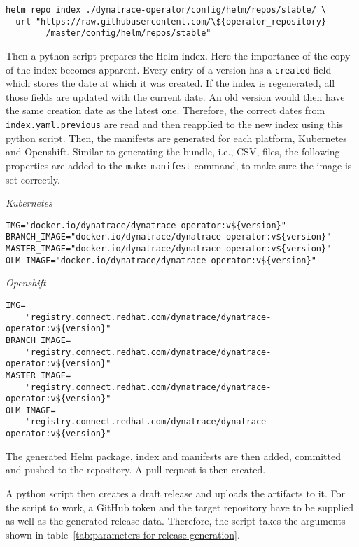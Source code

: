 \begin{verbatim}
helm repo index ./dynatrace-operator/config/helm/repos/stable/ \
--url "https://raw.githubusercontent.com/\${operator_repository}
        /master/config/helm/repos/stable"
\end{verbatim}

Then a python script prepares the Helm index.
Here the importance of the copy of the index becomes apparent.
Every entry of a version has a \verb|created| field which stores the date at which it was created.
If the index is regenerated, all those fields are updated with the current date.
An old version would then have the same creation date as the latest one.
Therefore, the correct dates from \verb|index.yaml.previous| are read and then reapplied to the new index using this python script.
Then, the manifests are generated for each platform, Kubernetes and Openshift.
Similar to generating the bundle, i.e., CSV, files, the following properties are added to the \verb|make manifest| command, to make sure the image is set correctly.

\textit{Kubernetes}

\begin{verbatim}
IMG="docker.io/dynatrace/dynatrace-operator:v${version}"
BRANCH_IMAGE="docker.io/dynatrace/dynatrace-operator:v${version}"
MASTER_IMAGE="docker.io/dynatrace/dynatrace-operator:v${version}"
OLM_IMAGE="docker.io/dynatrace/dynatrace-operator:v${version}"
\end{verbatim}

\textit{Openshift}

\begin{verbatim}
IMG=
    "registry.connect.redhat.com/dynatrace/dynatrace-operator:v${version}"
BRANCH_IMAGE=
    "registry.connect.redhat.com/dynatrace/dynatrace-operator:v${version}"
MASTER_IMAGE=
    "registry.connect.redhat.com/dynatrace/dynatrace-operator:v${version}"
OLM_IMAGE=
    "registry.connect.redhat.com/dynatrace/dynatrace-operator:v${version}"
\end{verbatim}

The generated Helm package, index and manifests are then added, committed and pushed to the repository.
A pull request is then created.

A python script then creates a draft release and uploads the artifacts to it.
For the script to work, a GitHub token and the target repository have to be supplied as well as the generated release data.
Therefore, the script takes the arguments shown in table~\ref{tab:parameters-for-release-generation}.

